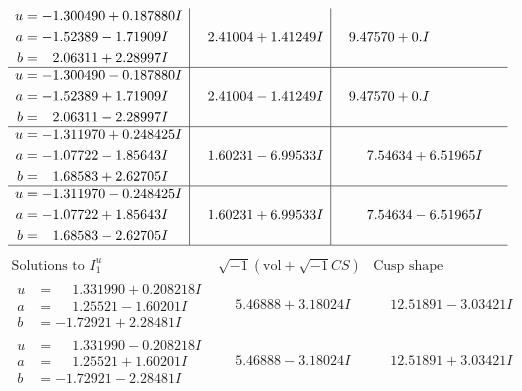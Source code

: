 \documentclass[1p]{elsarticle_modified}
\theoremstyle{definition}
\newcommand{\I}{\sqrt{-1}}
\begin{document}
$$\begin{array}{c|c|c}
\begin{aligned}
u &= -1.300490 + 0.187880 I \\
a &= -1.52389 - 1.71909 I \\
b &= \phantom{-}2.06311 + 2.28997 I\end{aligned}
 & \phantom{-}2.41004 + 1.41249 I & \phantom{-}9.47570 + 0. I\phantom{ +0.000000I} \\ \hline\begin{aligned}
u &= -1.300490 - 0.187880 I \\
a &= -1.52389 + 1.71909 I \\
b &= \phantom{-}2.06311 - 2.28997 I\end{aligned}
 & \phantom{-}2.41004 - 1.41249 I & \phantom{-}9.47570 + 0. I\phantom{ +0.000000I} \\ \hline\begin{aligned}
u &= -1.311970 + 0.248425 I \\
a &= -1.07722 - 1.85643 I \\
b &= \phantom{-}1.68583 + 2.62705 I\end{aligned}
 & \phantom{-}1.60231 - 6.99533 I & \phantom{-}7.54634 + 6.51965 I \\ \hline\begin{aligned}
u &= -1.311970 - 0.248425 I \\
a &= -1.07722 + 1.85643 I \\
b &= \phantom{-}1.68583 - 2.62705 I\end{aligned}
 & \phantom{-}1.60231 + 6.99533 I & \phantom{-}7.54634 - 6.51965 I\\
 \hline 
 \end{array}$$\newpage$$\begin{array}{c|c|c}  
\text{Solutions to }I^u_{1}& \I (\text{vol} + \sqrt{-1}CS) & \text{Cusp shape}\\
 \hline 
\begin{aligned}
u &= \phantom{-}1.331990 + 0.208218 I \\
a &= \phantom{-}1.25521 - 1.60201 I \\
b &= -1.72921 + 2.28481 I\end{aligned}
 & \phantom{-}5.46888 + 3.18024 I & \phantom{-}12.51891 - 3.03421 I \\ \hline\begin{aligned}
u &= \phantom{-}1.331990 - 0.208218 I \\
a &= \phantom{-}1.25521 + 1.60201 I \\
b &= -1.72921 - 2.28481 I\end{aligned}
 & \phantom{-}5.46888 - 3.18024 I & \phantom{-}12.51891 + 3.03421 I \\ \hline\begin{aligned}

\end{aligned}
\end{array}$$
\end{document}
